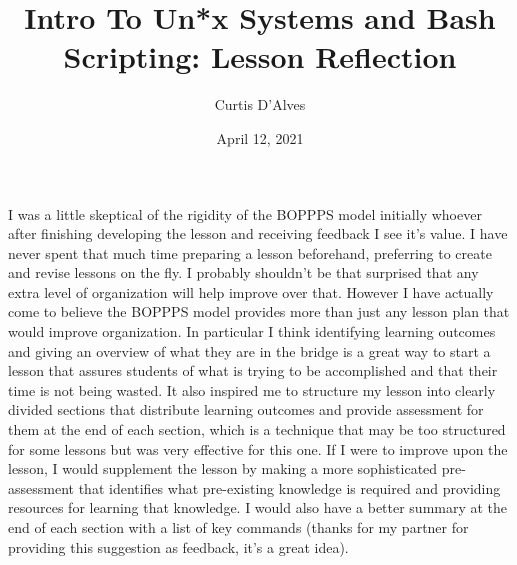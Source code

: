 \documentclass{article}
\author{Curtis D'Alves}
\date{April 12, 2021}
\title{Intro To Un*x Systems and Bash Scripting: Lesson Reflection}
\begin{document}
\maketitle
I was a little skeptical of the rigidity of the BOPPPS model initially whoever
after finishing developing the lesson and receiving feedback I see it's value. I
have never spent that much time preparing a lesson beforehand, preferring to
create and revise lessons on the fly. I probably shouldn't be that surprised
that any extra level of organization will help improve over that. However I have
actually come to believe the BOPPPS model provides more than just any lesson
plan that would improve organization. In particular I think identifying learning
outcomes and giving an overview of what they are in the bridge is a great way to
start a lesson that assures students of what is trying to be accomplished and
that their time is not being wasted. It also inspired me to structure my lesson
into clearly divided sections that distribute learning outcomes and provide
assessment for them at the end of each section, which is a technique that may be
too structured for some lessons but was very effective for this one. If I were
to improve upon the lesson, I would supplement the lesson by making a more
sophisticated pre-assessment that identifies what pre-existing knowledge is
required and providing resources for learning that knowledge. I would also have
a better summary at the end of each section with a list of key commands (thanks
for my partner for providing this suggestion as feedback, it's a great idea).
\end{document}
